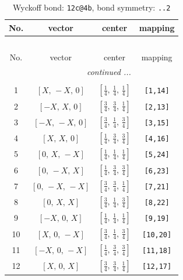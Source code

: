 \documentclass[fleqn,8pt]{jsarticle}
\begin{document}
\renewcommand{\arraystretch}{1.2}
\begin{longtable}{cccc}
\caption{Wyckoff bond: {\tt 12c@4b}, bond symmetry: {\tt ..2}}
 \\
 \hline \hline
No. & vector & center & mapping \\ \hline \endfirsthead

\multicolumn{3}{l}{\tablename\ \thetable{}} \\
 \hline \hline
No. & vector & center & mapping \\ \hline \endhead

 \hline \hline
\multicolumn{3}{r}{\footnotesize\it continued ...} \\ \endfoot

 \hline \hline
\multicolumn{3}{r}{} \\ \endlastfoot

1 & $\left[ X,\, - X,\, 0 \right]$ & $\left[ \frac{1}{4},\, \frac{1}{4},\, \frac{1}{4} \right]$ & {\tt [1,14]} \\ \hline
2 & $\left[ - X,\, X,\, 0 \right]$ & $\left[ \frac{3}{4},\, \frac{3}{4},\, \frac{1}{4} \right]$ & {\tt [2,13]} \\ \hline
3 & $\left[ - X,\, - X,\, 0 \right]$ & $\left[ \frac{3}{4},\, \frac{1}{4},\, \frac{3}{4} \right]$ & {\tt [3,15]} \\ \hline
4 & $\left[ X,\, X,\, 0 \right]$ & $\left[ \frac{1}{4},\, \frac{3}{4},\, \frac{3}{4} \right]$ & {\tt [4,16]} \\ \hline
5 & $\left[ 0,\, X,\, - X \right]$ & $\left[ \frac{1}{4},\, \frac{1}{4},\, \frac{1}{4} \right]$ & {\tt [5,24]} \\ \hline
6 & $\left[ 0,\, - X,\, X \right]$ & $\left[ \frac{1}{4},\, \frac{3}{4},\, \frac{3}{4} \right]$ & {\tt [6,23]} \\ \hline
7 & $\left[ 0,\, - X,\, - X \right]$ & $\left[ \frac{3}{4},\, \frac{3}{4},\, \frac{1}{4} \right]$ & {\tt [7,21]} \\ \hline
8 & $\left[ 0,\, X,\, X \right]$ & $\left[ \frac{3}{4},\, \frac{1}{4},\, \frac{3}{4} \right]$ & {\tt [8,22]} \\ \hline
9 & $\left[ - X,\, 0,\, X \right]$ & $\left[ \frac{1}{4},\, \frac{1}{4},\, \frac{1}{4} \right]$ & {\tt [9,19]} \\ \hline
10 & $\left[ X,\, 0,\, - X \right]$ & $\left[ \frac{3}{4},\, \frac{1}{4},\, \frac{3}{4} \right]$ & {\tt [10,20]} \\ \hline
11 & $\left[ - X,\, 0,\, - X \right]$ & $\left[ \frac{1}{4},\, \frac{3}{4},\, \frac{3}{4} \right]$ & {\tt [11,18]} \\ \hline
12 & $\left[ X,\, 0,\, X \right]$ & $\left[ \frac{3}{4},\, \frac{3}{4},\, \frac{1}{4} \right]$ & {\tt [12,17]} \\
\end{longtable}
\end{document}
